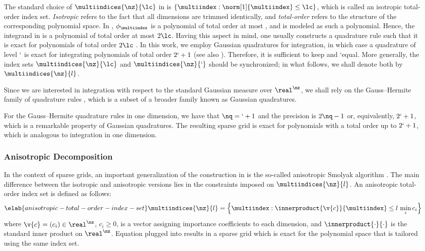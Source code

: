 The standard choice of $\multiindices{\nz}{\lc}$ in
 is $\{ \multiindex: \norm[1]{\multiindex} \leq \lc
\}$, which is called an isotropic total-order index set. \emph{Isotropic} refers
to the fact that all dimensions are trimmed identically, and \emph{total-order}
refers to the structure of the corresponding polynomial space. In
, $\phi_{\multiindex}$ is a polynomial of total
order at most \lc, and \g is modeled as such a polynomial. Hence, the integrand
in  is a polynomial of total order at most $2 \lc$.
Having this aspect in mind, one usually constructs a quadrature rule such that
it is exact for polynomials of total order $2 \lc$ \cite{eldred2008}. In this
work, we employ Gaussian quadratures for integration, in which case a quadrature
of level $\lq$ is exact for integrating polynomials of total order $2 \lq + 1$
\cite{heiss2008} (see also ). Therefore, it is
sufficient to keep \lc and \lq equal. More generally, the index sets
$\multiindices{\nz}{\lc}$ and $\multiindices{\nz}{\lq}$ should be synchronized;
in what follows, we shall denote both by $\multiindices{\nz}{l}$.

Since we are interested in integration with respect to the standard Gaussian
measure over $\real^\nz$, we shall rely on the Gauss--Hermite family of
quadrature rules \cite{maitre2010}, which is a subset of a broader family known
as Gaussian quadratures.

For the Gauss--Hermite quadrature rules in one dimension, we have that $\nq =
\lq + 1$ and the precision is $2 \nq - 1$ \cite{heiss2008} or, equivalently, $2
\lq + 1$, which is a remarkable property of Gaussian quadratures. The resulting
sparse grid is exact for polynomials with a total order up to $2 \lq + 1$, which
is analogous to integration in one dimension.

\subsubsection{Anisotropic Decomposition}

In the context of sparse grids, an important generalization of the construction
in  is the so-called anisotropic Smolyak algorithm
\cite{nobile2008}. The main difference between the isotropic and anisotropic
versions lies in the constraints imposed on $\multiindices{\nz}{l}$. An
anisotropic total-order index set is defined as follows:
\begin{equation} \elab{anisotropic-total-order-index-set}
  \multiindices{\nz}{l} = \left\{ \multiindex: \innerproduct{\v{c}}{\multiindex} \leq l \, \min_i c_i \right\}
\end{equation}
where $\v{c} = (c_i) \in \real^\nz$, $c_i \geq 0$, is a vector assigning
importance coefficients to each dimension, and $\innerproduct{\cdot}{\cdot}$ is
the standard inner product on $\real^\nz$. Equation
 plugged into 
results in a sparse grid which is exact for the polynomial space that is
tailored using the same index set.

